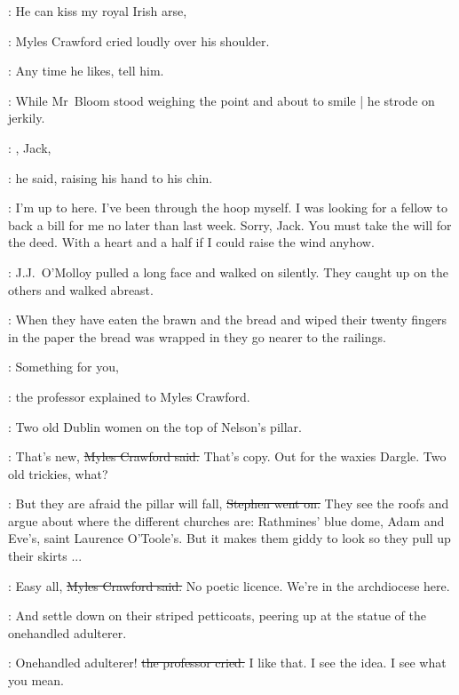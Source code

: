 \crawford:
He can kiss my royal Irish arse,

:
Myles Crawford cried loudly over his shoulder.

\crawford:
Any time he likes, tell him.


:
While Mr~Bloom stood weighing the point
and about to smile |
he strode on jerkily.



\crawford:
, Jack,

:
he said,
raising his hand to his chin.

\crawford:
I'm up to here.
I've been through the hoop myself.
I was looking for a fellow to back a bill for me no later than last week.
Sorry, Jack.
You must take the will for the deed.
With a heart and a half if I could raise the wind anyhow.

:
J.J.~O'Molloy pulled a long face and walked on silently.
They caught up on the others and walked abreast.

\Stephen:
When they have eaten the brawn and the bread
and wiped their twenty fingers in the paper the bread was wrapped in
they go nearer to the railings.

\machugh:
Something for you,

:
the professor explained to Myles Crawford.

\machugh:
Two old Dublin women on the top of Nelson's pillar.



\crawford:
That's new,
\sout{Myles Crawford said.}
That's copy.
Out for the waxies Dargle.
Two old trickies, what?

\Stephen:
But they are afraid the pillar will fall,
\sout{Stephen went on.}
They see the roofs and argue about where the different churches are:
Rathmines' blue dome,
Adam and Eve's,
saint Laurence O'Toole's.
But it makes them giddy to look
so they pull up their skirts ...



\crawford:
Easy all,
\sout{Myles Crawford said.}
No poetic licence.
We're in the archdiocese here.

\Stephen:
And settle down on their striped petticoats,
peering up at the statue of the onehandled adulterer.

\machugh:
Onehandled adulterer!
\sout{the professor cried.}
I like that.
I see the idea.
I see what you mean.


